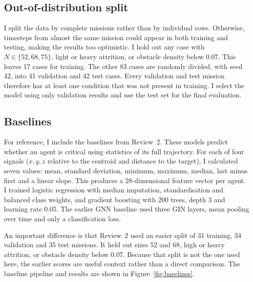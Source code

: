 \documentclass[11pt,a4paper]{article}
\begin{document}
\subsection{Out-of-distribution split}
I split the data by complete missions rather than by individual rows. Otherwise, timesteps from almost the same
mission could appear in both training and testing, making the results too optimistic. I hold out any case with
$N\in\{52,68,75\}$, light or heavy attrition, or obstacle density below 0.07. This leaves 17 cases for training.
The other 83 cases are randomly divided, with seed 42, into 41 validation and 42 test cases. Every validation and
test mission therefore has at least one condition that was not present in training. I select the model using only
validation results and use the test set for the final evaluation.

\subsection{Baselines}
For reference, I include the baselines from Review~2. These models predict whether an agent is critical using
statistics of its full trajectory. For each of four signals ($x,y,z$ relative to the centroid and distance to the
target), I calculated seven values: mean, standard deviation, minimum, maximum, median, last minus first and a
linear slope. This produces a 28-dimensional feature vector per agent. I trained logistic regression with median
imputation, standardisation and balanced class weights, and gradient boosting with 200 trees, depth 3 and learning
rate 0.05. The earlier GNN baseline used three GIN layers, mean pooling over time and only a classification loss.

An important difference is that Review~2 used an easier split of 31 training, 34 validation and 35 test missions.
It held out sizes 52 and 68, high or heavy attrition, or obstacle density below 0.07. Because that split is not
the one used here, the earlier scores are useful context rather than a direct comparison. The baseline pipeline
and results are shown in Figure~\ref{fig:baselines}.
\end{document}

